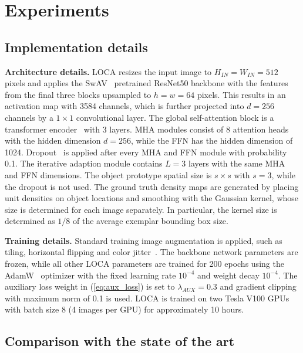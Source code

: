 \documentclass[10pt,twocolumn,letterpaper]{article}
\begin{document}
\section{Experiments}

\subsection{Implementation details}



\textbf{Architecture details.} 
LOCA resizes the input image to $H_{IN}=W_{IN}=512$ pixels and applies the SwAV~\cite{swav} pretrained ResNet50 backbone with the features from the final three blocks upsampled to $h=w=64$ pixels. This results in an activation map with 3584 channels, which is further projected into $d=256$ channels by a $1 \times 1$ convolutional layer. The global self-attention block is a transformer encoder~\cite{detr, transformer} with 3 layers. MHA modules consist of 8 attention heads with the hidden dimension $d=256$, while the FFN has the hidden dimension of 1024. Dropout~\cite{dropout} is applied after every MHA and FFN module with probability 0.1. The iterative adaption module contains $L=3$ layers with the same MHA and FFN dimensions. The object prototype spatial size is $s \times s$ with $s=3$, while the dropout is not used. The ground truth density maps are generated by placing unit densities on object locations and smoothing with the Gaussian kernel, whose size is determined for each image separately. In particular, the kernel size is determined as $1/8$ of the average exemplar bounding box size.



\textbf{Training details.} Standard training image augmentation is applied, such as tiling, horizontal flipping and color jitter~\cite{countr}. The backbone network parameters are frozen, while all other LOCA parameters are trained for 200 epochs using the AdamW~\cite{adamw} optimizer with the fixed learning rate $10^{-4}$ and weight decay $10^{-4}$. The auxiliary loss weight in (\ref{eq:aux_loss}) is set to $\lambda_{AUX}=0.3$ and gradient clipping with maximum norm of 0.1 is used. LOCA is trained on two Tesla V100 GPUs with batch size 8 (4 images per GPU) for approximately 10 hours.






\subsection{Comparison with the state of the art}
\label{sec:sota}
\end{document}
